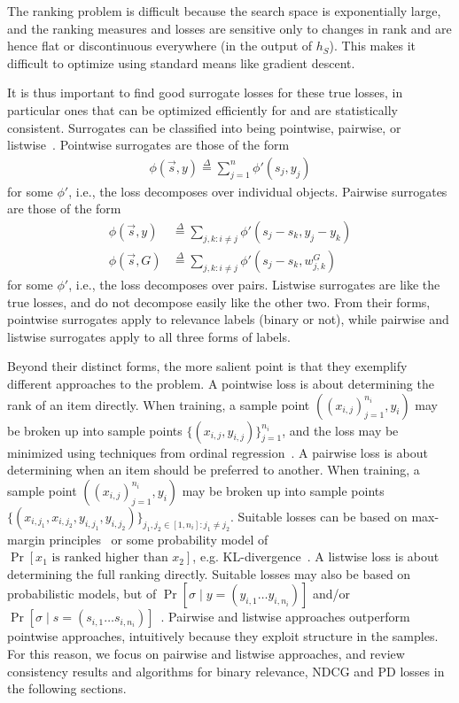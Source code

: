 The ranking problem is difficult because the search
space is exponentially large, and the ranking measures and losses are
sensitive only to changes in rank and are hence flat or discontinuous
everywhere (in the output of $h_S$). This makes it difficult to optimize
using standard means like gradient descent. 

It is thus important to find good surrogate losses for these true losses, in
particular ones that can be optimized efficiently for and are statistically
consistent.
Surrogates can be classified into being pointwise, pairwise,
or listwise~\cite{ir-survey}.
Pointwise surrogates are those of the form
\begin{align*}
  \phi(\vec{s}, y) \stackrel{\Delta}{=} \sum_{j=1}^n \phi'(s_j, y_j)
\end{align*}
for some $\phi'$, i.e., the loss decomposes over individual objects. 
Pairwise surrogates are those of the form
\begin{align*}
  \phi(\vec{s}, y)
  &\stackrel{\Delta}{=}
  \sum_{j,k : i \neq j} \phi'(s_j - s_k, y_j - y_k) \\
  \phi(\vec{s}, G)
  &\stackrel{\Delta}{=}
  \sum_{j,k : i \neq j} \phi'(s_j - s_k, w_{j,k}^G) 
\end{align*}
for some $\phi'$,
i.e., the loss decomposes over pairs. Listwise surrogates are
like the true losses, and do not decompose easily like the other two.
From their forms, pointwise surrogates apply to
relevance labels (binary or not), while pairwise and listwise surrogates
apply to all three forms of labels.

Beyond their distinct forms, the more salient point is that they exemplify
different approaches to the problem.
A pointwise loss is about determining the rank of an item directly.
When training, a sample point $((x_{i,j})_{j=1}^{n_i}, y_i)$ may be broken up
into sample points $\{(x_{i, j}, y_{i, j})\}_{j=1}^{n_i}$, and the loss may be
minimized using techniques from ordinal regression~\cite{}.
A pairwise loss is about determining when an item should be preferred to
another. When training, a sample point $((x_{i,j})_{j=1}^{n_i}, y_i)$ may be
broken up into sample points
$\{ (x_{i, j_1}, x_{i, j_2}, y_{i, j_1}, y_{i, j_2}) \}_{j_1, j_2 \in [1, n_i]: j_1 \neq j_2}$.
Suitable losses can be based on max-margin
principles~\cite{ranking-with-large-margin-principle} or 
some probability model of $\Pr[\text{$x_1$ is ranked higher than $x_2$}]$,
e.g. KL-divergence~\cite{ranknet}. 
A listwise loss is about determining the full ranking directly. Suitable losses
may also be based on probabilistic models, but of
$\Pr[\sigma \mid y = (y_{i,1} \ldots y_{i, n_i})]$ and/or
$\Pr[\sigma \mid s = (s_{i,1} \ldots s_{i, n_i})]$~\cite{listmle, listnet}.
Pairwise and listwise approaches outperform pointwise approaches, intuitively
because they exploit structure in the samples. For this reason, 
we focus on pairwise and listwise approaches, and review consistency results
and algorithms for binary relevance, NDCG and PD losses in the following
sections.

